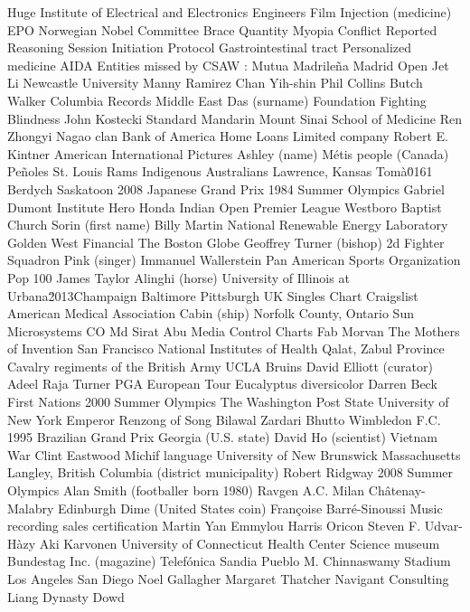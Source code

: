 Huge  Institute of Electrical and Electronics Engineers  Film  
Injection (medicine)  EPO  Norwegian Nobel Committee  
Brace  Quantity  Myopia  
Conflict  Reported  Reasoning  
Session Initiation Protocol  Gastrointestinal tract  Personalized medicine  
AIDA Entities missed by CSAW : 
Mutua Madrileña Madrid Open  Jet Li  Newcastle University  
Manny Ramirez  Chan Yih-shin  Phil Collins  
Butch Walker  Columbia Records  Middle East  
Das (surname)  Foundation Fighting Blindness  John Kostecki  
Standard Mandarin  Mount Sinai School of Medicine  Ren Zhongyi  
Nagao clan  Bank of America Home Loans  Limited company  
Robert E. Kintner  American International Pictures  Ashley (name)  
Métis people (Canada)  Peñoles  St. Louis Rams  
Indigenous Australians  Lawrence, Kansas  Tomà\u0161 Berdych  
Saskatoon  2008 Japanese Grand Prix  1984 Summer Olympics  
Gabriel Dumont Institute  Hero Honda Indian Open  Premier League  
Westboro Baptist Church  Sorin (first name)  Billy Martin  
National Renewable Energy Laboratory  Golden West Financial  The Boston Globe  
Geoffrey Turner (bishop)  2d Fighter Squadron  Pink (singer)  
Immanuel Wallerstein  Pan American Sports Organization  Pop 100  
James Taylor  Alinghi (horse)  University of Illinois at Urbana\u2013Champaign  
Baltimore  Pittsburgh  UK Singles Chart  
Craigslist  American Medical Association  Cabin (ship)  
Norfolk County, Ontario  Sun Microsystems  CO  
Md Sirat Abu  Media Control Charts  Fab Morvan  
The Mothers of Invention  San Francisco  National Institutes of Health  
Qalat, Zabul Province  Cavalry regiments of the British Army  UCLA Bruins  
David Elliott (curator)  Adeel Raja  Turner  
PGA European Tour  Eucalyptus diversicolor  Darren Beck  
First Nations  2000 Summer Olympics  The Washington Post  
State University of New York  Emperor Renzong of Song  Bilawal Zardari Bhutto  
Wimbledon F.C.  1995 Brazilian Grand Prix  Georgia (U.S. state)  
David Ho (scientist)  Vietnam War  Clint Eastwood  
Michif language  University of New Brunswick  Massachusetts  
Langley, British Columbia (district municipality)  Robert Ridgway  2008 Summer Olympics  
Alan Smith (footballer born 1980)  Ravgen  A.C. Milan  
Châtenay-Malabry  Edinburgh  Dime (United States coin)  
Françoise Barré-Sinoussi  Music recording sales certification  Martin Yan  
Emmylou Harris  Oricon  Steven F. Udvar-Hàzy  
Aki Karvonen  University of Connecticut Health Center  Science museum  
Bundestag  Inc. (magazine)  Telefónica  
Sandia Pueblo  M. Chinnaswamy Stadium  Los Angeles  
San Diego  Noel Gallagher  Margaret Thatcher  
Navigant Consulting  Liang Dynasty  Dowd  
